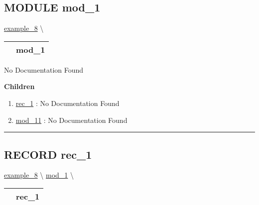 \subsection*{\textsf{\colorbox{headtoc}{\color{white} MODULE}
mod\_1}}

\hypertarget{ecldoc:intest.inintest.example_8.mod_1}{}
\hspace{0pt} \hyperlink{ecldoc:intest.inintest.example_8}{example_8} \textbackslash 

{\renewcommand{\arraystretch}{1.5}
\begin{tabularx}{\textwidth}{|>{\raggedright\arraybackslash}l|X|}
\hline
\hspace{0pt}\mytexttt{\color{red} } & \textbf{mod\_1} \\
\hline
\end{tabularx}
}

\par





No Documentation Found







\textbf{Children}
\begin{enumerate}
\item \hyperlink{ecldoc:intest.inintest.example_8.mod_1.rec_1}{rec\_1}
: No Documentation Found
\item \hyperlink{ecldoc:intest.inintest.example_8.mod_1.mod_11}{mod\_11}
: No Documentation Found
\end{enumerate}

\rule{\linewidth}{0.5pt}

\subsection*{\textsf{\colorbox{headtoc}{\color{white} RECORD}
rec\_1}}

\hypertarget{ecldoc:intest.inintest.example_8.mod_1.rec_1}{}
\hspace{0pt} \hyperlink{ecldoc:intest.inintest.example_8}{example_8} \textbackslash 
\hspace{0pt} \hyperlink{ecldoc:intest.inintest.example_8.mod_1}{mod_1} \textbackslash 

{\renewcommand{\arraystretch}{1.5}
\begin{tabularx}{\textwidth}{|>{\raggedright\arraybackslash}l|X|}
\hline
\hspace{0pt}\mytexttt{\color{red} } & \textbf{rec\_1} \\
\hline
\end{tabularx}
}

